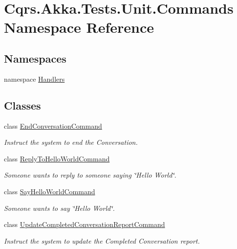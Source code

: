 \hypertarget{namespaceCqrs_1_1Akka_1_1Tests_1_1Unit_1_1Commands}{}\section{Cqrs.\+Akka.\+Tests.\+Unit.\+Commands Namespace Reference}
\label{namespaceCqrs_1_1Akka_1_1Tests_1_1Unit_1_1Commands}
\subsection*{Namespaces}
\begin{DoxyCompactItemize}
\item 
namespace \hyperlink{namespaceCqrs_1_1Akka_1_1Tests_1_1Unit_1_1Commands_1_1Handlers}{Handlers}
\end{DoxyCompactItemize}
\subsection*{Classes}
\begin{DoxyCompactItemize}
\item 
class \hyperlink{classCqrs_1_1Akka_1_1Tests_1_1Unit_1_1Commands_1_1EndConversationCommand}{End\+Conversation\+Command}
\begin{DoxyCompactList}\small\item\em Instruct the system to end the Conversation. \end{DoxyCompactList}\item 
class \hyperlink{classCqrs_1_1Akka_1_1Tests_1_1Unit_1_1Commands_1_1ReplyToHelloWorldCommand}{Reply\+To\+Hello\+World\+Command}
\begin{DoxyCompactList}\small\item\em Someone wants to reply to someone saying \char`\"{}\+Hello World\char`\"{}. \end{DoxyCompactList}\item 
class \hyperlink{classCqrs_1_1Akka_1_1Tests_1_1Unit_1_1Commands_1_1SayHelloWorldCommand}{Say\+Hello\+World\+Command}
\begin{DoxyCompactList}\small\item\em Someone wants to say \char`\"{}\+Hello World\char`\"{}. \end{DoxyCompactList}\item 
class \hyperlink{classCqrs_1_1Akka_1_1Tests_1_1Unit_1_1Commands_1_1UpdateCompletedConversationReportCommand}{Update\+Completed\+Conversation\+Report\+Command}
\begin{DoxyCompactList}\small\item\em Instruct the system to update the Completed Conversation report. \end{DoxyCompactList}\end{DoxyCompactItemize}
